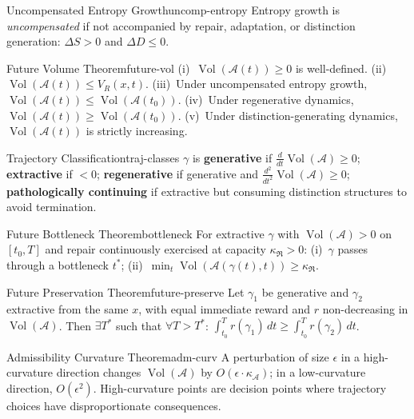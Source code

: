 \documentclass[12pt,twoside,openright]{book}
\newcommand{\adm}{\mathcal{A}}
\newcommand{\repair}{\mathfrak{R}}
\newcommand{\Vol}{\operatorname{Vol}}
\newcounter{exercise}[chapter]
\begin{document}
\begin{definition}{Uncompensated Entropy Growth}{uncomp-entropy}
  Entropy growth is \emph{uncompensated} if not accompanied
  by repair, adaptation, or distinction generation:
  $\Delta S>0$ and $\Delta D\le0$.
\end{definition}

\begin{theorem}{Future Volume Theorem}{future-vol}
  (i)~$\Vol(\adm(t))\ge0$ is well-defined.
  (ii)~$\Vol(\adm(t))\le V_R(x,t)$.
  (iii)~Under uncompensated entropy growth,
  $\Vol(\adm(t))\le\Vol(\adm(t_0))$.
  (iv)~Under regenerative dynamics,
  $\Vol(\adm(t))\ge\Vol(\adm(t_0))$.
  (v)~Under distinction-generating dynamics,
  $\Vol(\adm(t))$ is strictly increasing.
\end{theorem}

\begin{definition}{Trajectory Classification}{traj-classes}
  $\gamma$ is \textbf{generative} if
  $\frac{d}{dt}\Vol(\adm)\ge0$;
  \textbf{extractive} if $<0$;
  \textbf{regenerative} if generative and
  $\frac{d^2}{dt^2}\Vol(\adm)\ge0$;
  \textbf{pathologically continuing} if extractive but
  consuming distinction structures to avoid termination.
\end{definition}

\begin{theorem}{Future Bottleneck Theorem}{bottleneck}
  For extractive $\gamma$ with $\Vol(\adm)>0$ on $[t_0,T]$
  and repair continuously exercised at capacity
  $\kappa_\repair>0$:
  (i)~$\gamma$ passes through a bottleneck $t^*$;
  (ii)~$\min_t\Vol(\adm(\gamma(t),t))\ge\kappa_\repair$.
\end{theorem}

\begin{theorem}{Future Preservation Theorem}{future-preserve}
  Let $\gamma_1$ be generative and $\gamma_2$ extractive
  from the same $x$, with equal immediate reward and $r$
  non-decreasing in $\Vol(\adm)$.
  Then $\exists T^*$ such that $\forall T>T^*$:
  $\int_{t_0}^T r(\gamma_1)\,dt\ge
  \int_{t_0}^T r(\gamma_2)\,dt$.
\end{theorem}

\begin{theorem}{Admissibility Curvature Theorem}{adm-curv}
  A perturbation of size $\epsilon$ in a high-curvature
  direction changes $\Vol(\adm)$ by
  $O(\epsilon\cdot\kappa_\adm)$; in a low-curvature
  direction, $O(\epsilon^2)$.
  High-curvature points are decision points where
  trajectory choices have disproportionate consequences.
\end{theorem}
\end{document}
